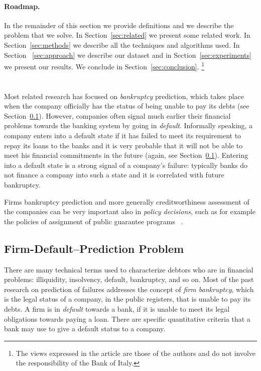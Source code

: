 \paragraph{Roadmap.} 
In the remainder of this section we provide definitions and we
describe the problem that we solve. 
In Section~\ref{sec:related} we present some related work. 
In Section~\ref{sec:methods} we
describe all the techniques and algorithms used. In Section ~\ref{sec:approach} we describe our dataset and in
Section~\ref{sec:experiments} we present our results. We conclude in
Section~\ref{sec:conclusion}. \footnote{The views expressed in the article are those of the authors and do not involve the responsibility of the Bank of Italy.}\\\\\\


Most related research has focused on \emph{bankruptcy} prediction, which
takes place when the company officially has the status of being unable
to pay its debts (see Section~\ref{sec:problem}). However, companies
often signal much earlier their financial problems towards the banking
system by going in \emph{default}. Informally speaking, a company enters
into a default state if it has failed to meet its requirement to repay
its loans to the banks and it is very probable that it will not be able to meet his financial commitments in the future
(again, see Section~\ref{sec:problem}). Entering into a
default state is a strong signal of a company's failure: typically banks
do not finance a company into such a state and it is correlated with
future bankruptcy.

Firms bankruptcy prediction and more generally creditworthiness assessment of the companies can be very important also in \emph{policy decisions}, such as for example the policies of assignment of public guarantee programs ~\cite{andini-19}.



\subsection{Firm-Default--Prediction Problem}
\label{sec:problem}


There are many technical terms used to characterize debtors who are in
financial problems: illiquidity, insolvency, default, bankruptcy, and so
on. Most of the past research on prediction of failures
addresses the concept of \emph{firm bankruptcy}, which is the legal
status of a company, in the public registers, that is unable to pay its
debts. A firm is in \emph{default} towards a bank, if it is unable to meet
its legal obligations towards paying a loan. There are specific
quantitative criteria that a bank may use to give a default status to a
company.


